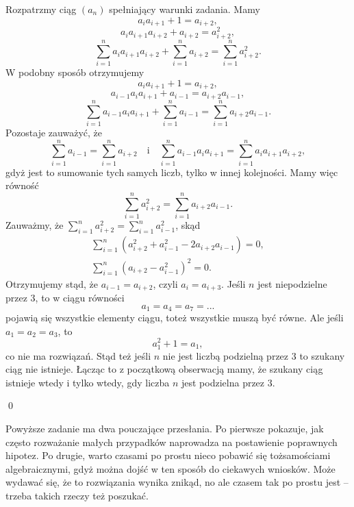 \vspace{10px}
\noindent
Rozpatrzmy ciąg $(a_n)$ spełniający warunki zadania. Mamy
\[
	a_ia_{i + 1} + 1 = a_{i + 2},
\]
\[
	a_ia_{i + 1}a_{i + 2} + a_{i + 2} = a_{i + 2}^2,
\]
\[
	\sum_{i = 1}^{n} a_ia_{i + 1}a_{i + 2} + \sum_{i = 1}^{n} a_{i + 2} = \sum_{i = 1}^{n} a_{i + 2}^2.
\]
W podobny sposób otrzymujemy
\[
	a_ia_{i + 1} + 1 = a_{i + 2},
\]
\[
	a_{i - 1}a_ia_{i + 1} + a_{i - 1} = a_{i + 2}a_{i - 1},
\]
\[
	\sum_{i = 1}^{n} a_{i - 1}a_ia_{i + 1} + \sum_{i = 1}^{n} a_{i - 1} = \sum_{i = 1}^{n} a_{i + 2}a_{i - 1}.
\]
Pozostaje zauważyć, że
\[
	\sum_{i = 1}^{n} a_{i - 1} = \sum_{i = 1}^{n} a_{i + 2} \quad \text{i} \quad \sum_{i = 1}^{n} a_{i - 1}a_ia_{i + 1} = \sum_{i = 1}^{n} a_ia_{i + 1}a_{i + 2},
\]
gdyż jest to sumowanie tych samych liczb, tylko w innej kolejności. Mamy więc równość
\[
	\sum_{i = 1}^{n} a_{i + 2}^2 = \sum_{i = 1}^{n} a_{i + 2}a_{i - 1}.
\]
Zauważmy, że $\sum_{i = 1}^{n} a_{i + 2}^2 = \sum_{i = 1}^{n} a_{i - 1}^2$, skąd
\begin{align*}
	\sum_{i = 1}^{n} \left(a_{i + 2}^2 + a_{i - 1}^2 - 2a_{i + 2}a_{i - 1}\right) = 0, \\
	\sum_{i = 1}^{n} \left(a_{i + 2} - a_{i - 1}^2\right)^2 = 0.
\end{align*}
Otrzymujemy stąd, że $a_{i - 1} = a_{i + 2}$, czyli $a_i = a_{i + 3}$. Jeśli $n$ jest niepodzielne przez $3$, to w ciągu równości
\[
	a_1 = a_4 = a_7 = ...
\]
pojawią się wszystkie elementy ciągu, toteż wszystkie muszą być równe. Ale jeśli ${a_1 = a_2 = a_3}$, to
\[
	a_1^2 + 1 = a_1,
\]
co nie ma rozwiązań. Stąd też jeśli $n$ nie jest liczbą podzielną przez $3$ to szukany ciąg nie istnieje. Łącząc to z początkową obserwacją mamy, że szukany ciąg istnieje wtedy i tylko wtedy, gdy liczba $n$ jest podzielna przez $3$.

\qed

\noindent
Powyższe zadanie ma dwa pouczające przesłania. Po pierwsze pokazuje, jak często rozważanie małych przypadków naprowadza na postawienie poprawnych hipotez. Po drugie, warto czasami po prostu nieco pobawić się tożsamościami algebraicznymi, gdyż można dojść w ten sposób do ciekawych wniosków. Może wydawać się, że to rozwiązania wynika znikąd, no ale czasem tak po prostu jest -- trzeba takich rzeczy też poszukać.

\vspace{10px}